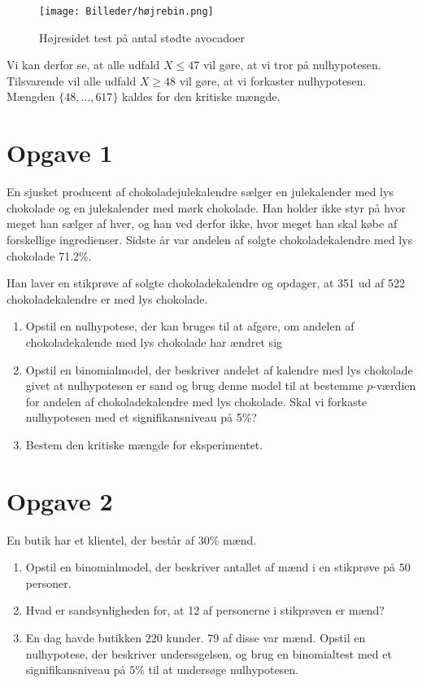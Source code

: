 \begin{figure}[H]
\texttt{[image: Billeder/højrebin.png]}
\caption{Højresidet test på antal stødte avocadoer}
\label{fig:højretest}
\end{figure}

Vi kan derfor se, at alle udfald $X\leq 47$ vil gøre, at vi tror på nulhypotesen. Tilsvarende vil alle udfald $X\geq 48$ vil gøre, at vi forkaster nulhypotesen. Mængden $\{48,\hdots,617\}$ kaldes for den kritiske mængde.

\section*{Opgave 1}
En sjusket producent af chokoladejulekalendre sælger en julekalender med lys chokolade og en julekalender med mørk chokolade. Han holder ikke styr på hvor meget han sælger af hver, og han ved derfor
ikke, hvor meget han skal købe af forskellige ingredienser. Sidste år var andelen af solgte chokoladekalendre med lys chokolade 71.2$\%$. 

Han laver en stikprøve af solgte chokoladekalendre og opdager, at 351 ud af 522 chokoladekalendre er med lys chokolade.
\begin{enumerate}[label=\roman*)]
	\item Opstil en nulhypotese, der kan bruges til at afgøre, om andelen af chokoladekalende med lys chokolade har ændret sig
	\item Opstil en binomialmodel, der beskriver andelet af kalendre med lys chokolade givet at nulhypotesen er sand og brug denne model til at bestemme $p$-værdien for andelen af chokoladekalendre med lys chokolade. Skal vi forkaste nulhypotesen med et signifikansniveau på 5$\%$?
	\item Bestem den kritiske mængde for eksperimentet.
\end{enumerate} 

\section*{Opgave 2}
En butik har et klientel, der består af $30\%$ mænd. 
\begin{enumerate}[label=\roman*)]
\item Opstil en binomialmodel, der beskriver antallet af mænd i en stikprøve på $50$ personer.
\item Hvad er sandsynligheden for, at 12 af personerne i stikprøven er mænd?
\item En dag havde butikken $220$ kunder. 79 af disse var mænd. Opstil en nulhypotese, der beskriver undersøgelsen, og brug en binomialtest med et signifikansniveau på $5\%$ til at undersøge nulhypotesen. 
\end{enumerate}


